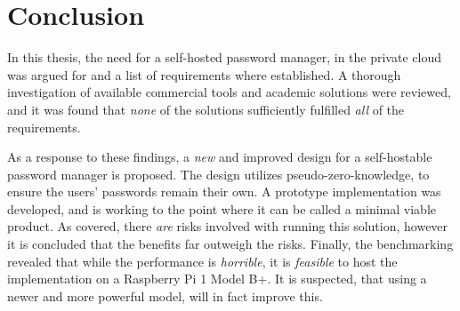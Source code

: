 \chapter{Conclusion}
	In this thesis, the need for a self-hosted password manager, in the private cloud was argued for and a list of requirements where established. A thorough investigation of available commercial tools and academic solutions were reviewed, and it was found that \emph{none} of the solutions sufficiently fulfilled \emph{all} of the requirements.

	As a response to these findings, a \emph{new} and improved design for a self-hostable password manager is proposed. The design utilizes pseudo-zero-knowledge, to ensure the users' passwords remain their own. A prototype implementation was developed, and is working to the point where it can be called a minimal viable product. As covered, there \emph{are} risks involved with running this solution, however it is concluded that the benefits far outweigh the risks. Finally, the benchmarking revealed that while the performance is \emph{horrible}, it is \emph{feasible} to host the implementation on a Raspberry Pi 1 Model B+. It is suspected, that using a newer and more powerful model, will in fact improve this. 